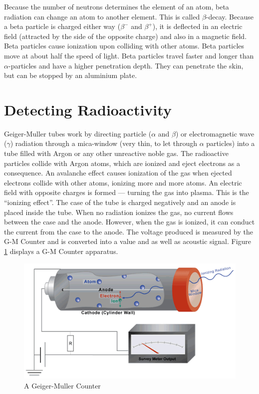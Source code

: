 Because the number of neutrons determines the element of an atom, beta radiation can change an atom to another element. This is called $\beta$-decay. Because a beta particle is charged either way ($\beta^-$ and $\beta^+$), it is deflected in an electric field (attracted by the side of the opposite charge) and also in a magnetic field. Beta particles cause ionization upon colliding with other atoms. Beta particles move at about half the speed of light. Beta particles travel faster and longer than $\alpha$-particles and have a higher penetration depth. They can penetrate the skin, but can be stopped by an aluminium plate.

\chapter*{Detecting Radioactivity}

Geiger-Muller tubes work by directing particle ($\alpha$ and $\beta$) or electromagnetic wave ($\gamma$) radiation through a mica-window (very thin, to let through $\alpha$ particles) into a tube filled with Argon or any other unreactive noble gas. The radioactive particles collide with Argon atoms, which are ionized and eject electrons as a consequence. An avalanche effect causes ionization of the gas when ejected electrons collide with other atoms, ionizing more and more atoms. An electric field with opposite charges is formed --- turning the gas into plasma. This is the ``ionizing effect''. The case of the tube is charged negatively and an anode is placed inside the tube. When no radiation ionizes the gas, no current flows between the case and the anode. However, when the gas is ionized, it can conduct the current from the case to the anode. The voltage produced is measured by the G-M Counter and is converted into a value and as well as acoustic signal. Figure \ref{fig:gm} displays a G-M Counter apparatus.

\begin{figure}[b!]
  \vspace{\baselineskip}
  \centering
  \includegraphics[scale=0.8]{img/gm}
  \caption{A Geiger-Muller Counter}
  \label{fig:gm}
\end{figure}

